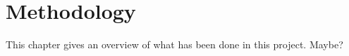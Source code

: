 
\chapter{Methodology}
\label{chap:methodology}

This chapter gives an overview of what has been done in this project.
Maybe?



